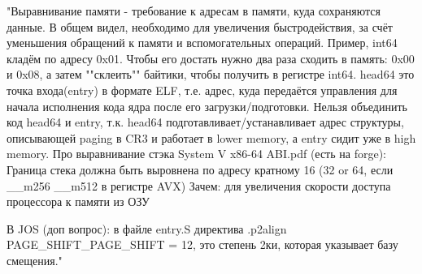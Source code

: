 \documentclass[a4paper,12pt]{article}
\begin{document}
"Выравнивание памяти - требование к адресам в памяти, куда сохраняются данные. В общем видел, необходимо для увеличения быстродействия, за счёт уменьшения обращений к памяти и вспомогательных операций. Пример, int64 кладём по адресу 0x01. Чтобы его достать нужно два раза сходить в память: 0x00 и 0x08, а затем ""склеить"" байтики, чтобы получить в регистре int64.  
head64 это точка входа(entry) в формате ELF, т.е. адрес, куда передаётся управления для начала исполнения кода ядра после его загрузки/подготовки. 
Нельзя объединить код head64 и entry, т.к. head64 подготавливает/устанавливает адрес структуры, описывающей paging в CR3 и работает в lower memory, а entry сидит уже в high memory. 
Про выравнивание стэка 
System V x86-64 ABI.pdf (есть на forge):
Граница стека должна быть выровнена по адресу кратному 16 (32 or 64, если \_\_m256 \_\_m512 в регистре AVX)
Зачем: для увеличения скорости доступа процессора к памяти из ОЗУ

В JOS (доп вопрос):
в файле entry.S директива 
.p2align PAGE\_SHIFT\_PAGE\_SHIFT = 12, это степень 2ки, которая указывает базу смещения."
\end{document}
